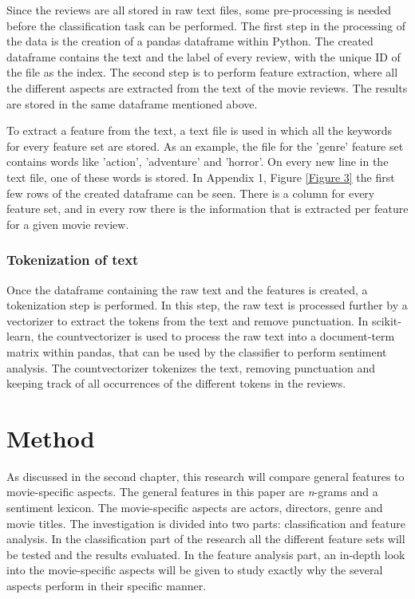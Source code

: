 \documentclass[
10pt, %
a4paper, %
oneside, %
headinclude,footinclude, %
] {book}%
\begin{document}
Since the reviews are all stored in raw text files, some pre-processing is needed before the classification task can be performed. The first step in the processing of the data is the creation of a pandas dataframe within Python. The created dataframe contains the text and the label of every review, with the unique ID of the file as the index. The second step is to perform feature extraction, where all the different aspects are extracted from the text of the movie reviews. The results are stored in the same dataframe mentioned above. 

To extract a feature from the text, a text file is used in which all the keywords for every feature set are stored. As an example, the file for the 'genre' feature set contains words like 'action', 'adventure' and 'horror'. On every new line in the text file, one of these words is stored. In Appendix 1, Figure \ref{Figure 3} the first few rows of the created dataframe can be seen. There is a column for every feature set, and in every row there is the information that is extracted per feature for a given movie review.

\subsection{Tokenization of text}

Once the dataframe containing the raw text and the features is created, a tokenization step is performed. In this step, the raw text is processed further by a vectorizer to extract the tokens from the text and remove punctuation. In scikit-learn, the countvectorizer is used to process the raw text into a document-term matrix within pandas, that can be used by the classifier to perform sentiment analysis. The countvectorizer tokenizes the text, removing punctuation and keeping track of all occurrences of the different tokens in the reviews.

\chapter{Method}

As discussed in the second chapter, this research will compare general features to movie-specific aspects. The general features in this paper are \textit n-grams and a sentiment lexicon. The movie-specific aspects are actors, directors, genre and movie titles. The investigation is divided into two parts: classification and feature analysis. In the classification part of the research all the different feature sets will be tested and the results evaluated. In the feature analysis part, an in-depth look into the movie-specific aspects will be given to study exactly why the several aspects perform in their specific manner. 
\end{document}
